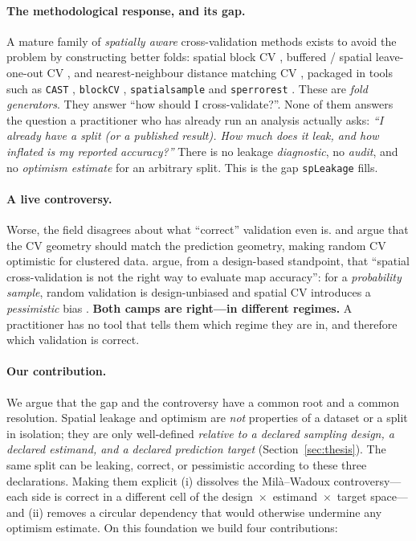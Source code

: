 \documentclass[11pt,a4paper]{article}
\begin{document}
\paragraph{The methodological response, and its gap.}
A mature family of \emph{spatially aware} cross-validation methods exists to avoid
the problem by constructing better folds: spatial block CV
\citep{roberts2017crossvalidation, valavi2019blockcv}, buffered / spatial
leave-one-out CV \citep{lerest2014sloo, telford2009evaluation}, and
nearest-neighbour distance matching CV \citep[NNDM/kNNDM;][]{mila2022nndm,
linnenbrink2024knndm}, packaged in tools such as \texttt{CAST}
\citep{meyer2024cast}, \texttt{blockCV} \citep{valavi2019blockcv},
\texttt{spatialsample} and \texttt{sperrorest} \citep{brenning2012sperrorest}.
These are \emph{fold generators}. They answer ``how should I cross-validate?''.
None of them answers the question a practitioner who has already run an analysis
actually asks: \emph{``I already have a split (or a published result). How much does
it leak, and how inflated is my reported accuracy?''} There is no leakage
\emph{diagnostic}, no \emph{audit}, and no \emph{optimism estimate} for an arbitrary
split. This is the gap \texttt{spLeakage} fills.

\paragraph{A live controversy.}
Worse, the field disagrees about what ``correct'' validation even is.
\citet{mila2022nndm} and \citet{linnenbrink2024knndm} argue that the CV geometry
should match the prediction geometry, making random CV optimistic for clustered
data. \citet{wadoux2021spatial} argue, from a design-based standpoint, that
``spatial cross-validation is not the right way to evaluate map accuracy'': for a
\emph{probability sample}, random validation is design-unbiased and spatial CV
introduces a \emph{pessimistic} bias \citep[see also][]{debruin2022clustered}.
\textbf{Both camps are right---in different regimes.} A practitioner has no tool
that tells them which regime they are in, and therefore which validation is
correct.

\paragraph{Our contribution.}
We argue that the gap and the controversy have a common root and a common
resolution. Spatial leakage and optimism are \emph{not} properties of a dataset or
a split in isolation; they are only well-defined \emph{relative to a declared
sampling design, a declared estimand, and a declared prediction target}
(Section~\ref{sec:thesis}). The same split can be leaking, correct, or pessimistic
according to these three declarations. Making them explicit (i) dissolves the
Mil\`a--Wadoux controversy---each side is correct in a different cell of the
design~$\times$~estimand~$\times$~target space---and (ii) removes a circular
dependency that would otherwise undermine any optimism estimate. On this
foundation we build four contributions:
\end{document}
